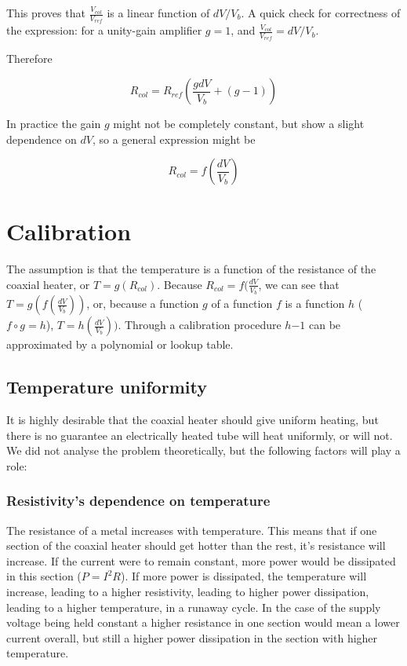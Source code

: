 This proves that \( \frac{\displaystyle V_{col}}{\displaystyle V_{ref}} \) is a
linear function of $dV/V_b$. A quick check for correctness of the expression:
for a unity-gain amplifier $g = 1$, and $\frac{\displaystyle
V_{col}}{\displaystyle V_{ref}} = dV/V_b$.

Therefore 

\[ R_{col} = R_{ref} \left(\frac{g{dV}}{V_b} + (g-1) \right) \]

In practice the gain \(g\) might not be completely constant, but show a slight
dependence on \(dV\), so a general expression might be

\[ R_{col} = f\left(\frac{dV}{V_b} \right) \]


\section{Calibration}

The assumption is that the temperature is a function of the resistance of the
coaxial heater, or \( T = g(R_{col}) \). Because \( R_{col}=f(\frac{dV}{V_b} \),
we can see that \( T = g(f(\frac{dV}{V_b})) \), or, because a function \(g\) of
a function \(f\) is a function \(h\) (\(f \circ g = h \)), \( T =
h(\frac{dV}{V_b})) \).  Through a calibration procedure \(h{-1}\) can be
approximated by a polynomial or lookup table.

\subsection{Temperature uniformity}
\label{sec:Uniformity}

It is highly desirable that the coaxial heater should give uniform heating, but
there is no guarantee an electrically heated tube will heat uniformly, or will
not. We did not analyse the problem theoretically, but the following factors
will play a role:

\subsubsection{Resistivity's dependence on temperature}

The resistance of a metal increases with temperature. This means that if one
section of the coaxial heater should get hotter than the rest, it's resistance
will increase. If the current were to remain constant, more power would be
dissipated in this section (\(P=I^2R\)). If more power is dissipated, the
temperature will increase, leading to a higher resistivity, leading to higher
power dissipation, leading to a higher temperature, in a runaway cycle. In the
case of the supply voltage being held constant a higher resistance in one section
would mean a lower current overall, but still a higher power dissipation in the
section with higher temperature.

